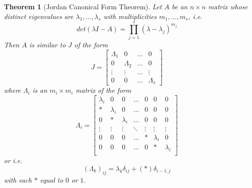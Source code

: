 \documentclass[twoside]{amsart}
\theoremstyle{plain}
\newtheorem{theorem}{Theorem}
\theoremstyle{definition}
\begin{document}
\begin{theorem}[Jordan Canonical Form Theorem]\label{T:Jordan_Canonical_Form}
  Let $A$ be an $n \times n $ matrix whose distinct eigenvalues are $\lambda_1, \dots , \lambda_s$ with multiplicities $m_1, \dots , m_s$, i.e. 
  \begin{equation*}
    det( \lambda I - A) = \prod_{j=1}^s (\lambda - \lambda_j)^{m_j}
  \end{equation*}
  Then $A$ is similar to $J$ of the form
  \begin{equation}
  J = \left[ 
    \begin{matrix}
      \Lambda_1 & 0 & \dots & 0 \\
      0 & \Lambda_2 & \dots & 0 \\
      \vdots & \vdots & \dots & \vdots \\
      0 & 0 & \dots & \Lambda_s
      \end{matrix}
    \right]
  \end{equation}
  where $\Lambda_i$ is an $m_i \times m_i $ matrix of the form
  \begin{equation}
    \Lambda_i = \left[ 
      \begin{matrix}
	\lambda_i & 0 & 0 & \dots & 0 & 0 & 0 \\
	* & \lambda_i & 0 & \dots & 0 & 0 & 0 \\
	0 & * & \lambda_i & \dots & 0 & 0 & 0 \\
	\vdots & \vdots & \vdots & \ddots & \vdots & \vdots & \vdots \\
	0 & 0 & 0 & \dots & * & \lambda_i & 0 \\
	0 & 0 & 0 & \dots & 0 & * & \lambda_i \\
	\end{matrix}
      \right]
  \end{equation}
  or i.e. 
  \[
  (\Lambda_k)_{ij} = \lambda_k \delta_{ij} + (*)\delta_{i-1,j}
  \]
  with each $*$ equal to $0$ or $1$.  
\end{theorem}
\end{document}
